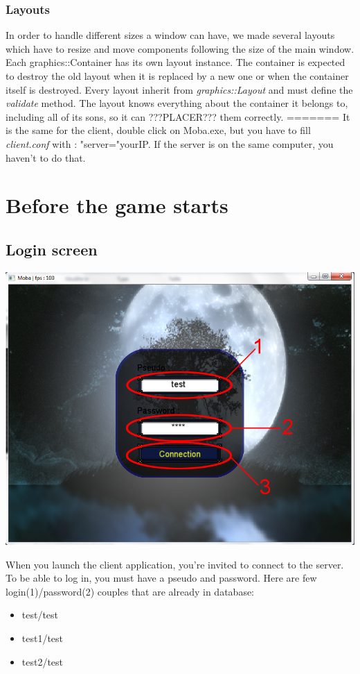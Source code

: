 \documentclass{scrreprt}
\begin{document}
						  \subsection{Layouts}
						  In order to handle different sizes a window can have, we made several layouts which have to resize and move components following the size of the main window. Each graphics::Container has its own layout instance. The container is expected to destroy the old layout when it is replaced by a new one or when the container itself is destroyed. Every layout inherit from \emph{graphics::Layout} and must define the \emph{validate} method. 
						  The layout knows everything about the container it belongs to, including all of its sons, so it can ???PLACER??? them correctly.
=======
		  It is the same for the client, double click on Moba.exe, but  you have to fill \emph{client.conf} with : "server="yourIP. If the server is on the same computer, you haven't to do that.

		  \chapter{Before the game starts}
		  \section{Login screen}
		  \begin{center}
		  \includegraphics[scale=0.4]{connection_screen.png}
		  \end{center}
		  When you launch the client application, you're invited to connect to the server. To be able to log in, you must have a pseudo and password. Here are few login(1)/password(2) couples that are already in database:
		  \begin{itemize}
		  \item{test/test}
		  \item{test1/test}
		  \item{test2/test}
		  \end{itemize}
\end{document}
